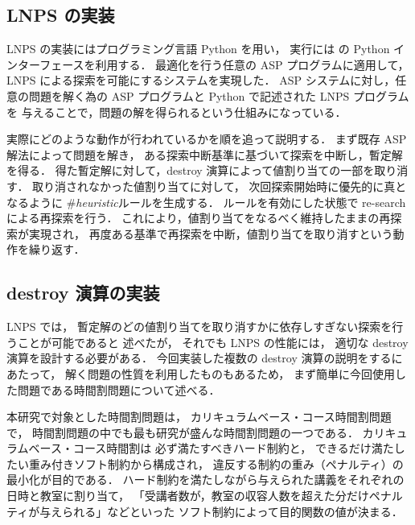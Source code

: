 \subsection{LNPS の実装}
LNPS の実装にはプログラミング言語 Python を用い，
実行には {\clingo} の Python インターフェースを利用する．
最適化を行う任意の ASP プログラムに適用して，LNPS による探索を可能にするシステムを実現した．
ASP システムに対し，任意の問題を解く為の ASP プログラムと Python で記述された LNPS プログラムを
与えることで，問題の解を得られるという仕組みになっている．

実際にどのような動作が行われているかを順を追って説明する．
まず既存 ASP 解法によって問題を解き，
ある探索中断基準に基づいて探索を中断し，暫定解を得る．
得た暫定解に対して，destroy 演算によって値割り当ての一部を取り消す．
取り消されなかった値割り当てに対して，
次回探索開始時に優先的に真となるように
\#\textit{heuristic}ルールを生成する．
ルールを有効にした状態で re-search による再探索を行う．
これにより，値割り当てをなるべく維持したままの再探索が実現され，
再度ある基準で再探索を中断，値割り当てを取り消すという動作を繰り返す．

\subsection{destroy 演算の実装}
LNPS では，
暫定解のどの値割り当てを取り消すかに依存しすぎない探索を行うことが可能であると
述べたが，
それでも LNPS の性能には，
適切な destroy 演算を設計する必要がある．
今回実装した複数の destroy 演算の説明をするにあたって，
解く問題の性質を利用したものもあるため，
まず簡単に今回使用した問題である時間割問題について述べる．

本研究で対象とした時間割問題は，
カリキュラムベース・コース時間割問題で，
時間割問題の中でも最も研究が盛んな時間割問題の一つである．
カリキュラムベース・コース時間割は
必ず満たすべきハード制約と，
できるだけ満たしたい重み付きソフト制約から構成され，
違反する制約の重み（ペナルティ）の最小化が目的である．
ハード制約を満たしながら与えられた講義をそれぞれの日時と教室に割り当て，
「受講者数が，教室の収容人数を超えた分だけペナルティが与えられる」などといった
ソフト制約によって目的関数の値が決まる．\\

